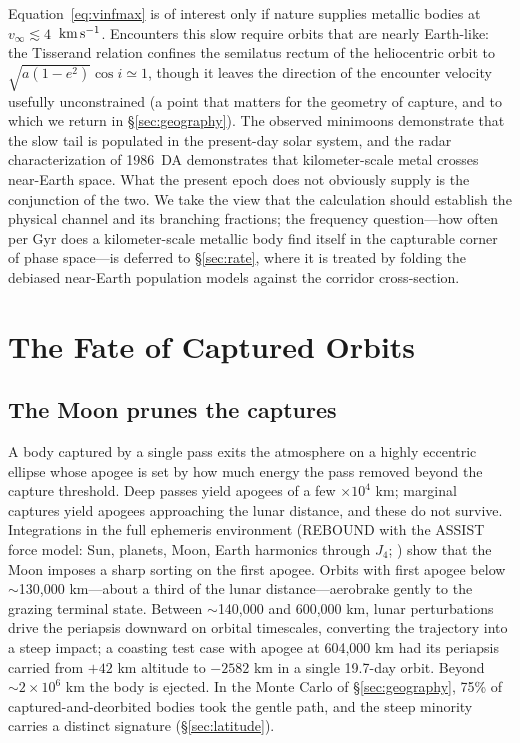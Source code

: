 \documentclass[twocolumn]{aastex701}
\newcommand{\vinf}{v_{\infty}}
\newcommand{\kms}{\ensuremath{{\rm \,km\,s^{-1}}}}
\begin{document}
Equation~\ref{eq:vinfmax} is of interest only if nature supplies metallic
bodies at $\vinf \lesssim 4$ \kms. Encounters this slow require orbits
that are nearly Earth-like: the Tisserand relation confines the
semilatus rectum of the heliocentric orbit to $\sqrt{a(1-e^{2})}\cos i
\simeq 1$, though it leaves the direction of the encounter velocity
usefully unconstrained (a point that matters for the geometry of capture,
and to which we return in \S\ref{sec:geography}). The observed minimoons
demonstrate that the slow tail is populated in the present-day solar
system, and the radar characterization of 1986~DA demonstrates that
kilometer-scale metal crosses near-Earth space. What the present epoch
does not obviously supply is the conjunction of the two. We take the view
that the calculation should establish the physical channel and its
branching fractions; the frequency question---how often per Gyr does a
kilometer-scale metallic body find itself in the capturable corner of
phase space---is deferred to \S\ref{sec:rate}, where it is treated by
folding the debiased near-Earth population models \citep{granvik2018,
nesvorny2023} against the corridor cross-section.

\section{The Fate of Captured Orbits} \label{sec:fate}

\subsection{The Moon prunes the captures} \label{sec:moon}

A body captured by a single pass exits the atmosphere on a highly eccentric
ellipse whose apogee is set by how much energy the pass removed beyond the
capture threshold. Deep passes yield apogees of a few $\times10^{4}$ km;
marginal captures yield apogees approaching the lunar distance, and these
do not survive. Integrations in the full ephemeris environment (REBOUND
with the ASSIST force model: Sun, planets, Moon, Earth harmonics through
$J_{4}$; \citealt{rein2012, holman2023, park2021}) show that the Moon
imposes a sharp sorting on the first apogee. Orbits with first apogee
below $\sim$130,000 km---about a third of the lunar distance---aerobrake
gently to the grazing terminal state. Between $\sim$140,000 and 600,000
km, lunar perturbations drive the periapsis downward on orbital timescales,
converting the trajectory into a steep impact; a coasting test case with
apogee at 604,000 km had its periapsis carried from $+42$ km altitude to
$-2582$ km in a single 19.7-day orbit. Beyond $\sim2\times10^{6}$ km the
body is ejected. In the Monte Carlo of \S\ref{sec:geography}, 75\% of
captured-and-deorbited bodies took the gentle path, and the steep minority
carries a distinct signature (\S\ref{sec:latitude}).
\end{document}
